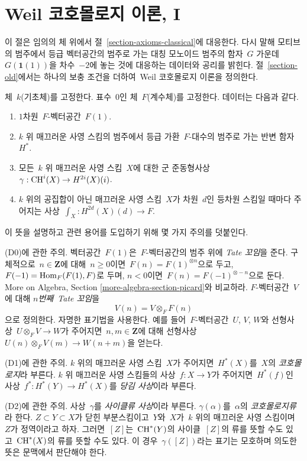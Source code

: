 \section{Weil 코호몰로지 이론, I}
\label{section-axioms}

\noindent
이 절은 임의의 체 위에서 절\  \ref{section-axioms-classical}에 대응한다.
다시 말해 모티브의 범주에서 등급 벡터공간의 범주로 가는 대칭 모노이드
범주의 함자\  $G$ 가운데\  $G(\mathbf{1}(1))$을 차수\  $-2$에 놓는 것에
대응하는 데이터와 공리를 밝힌다. 절\  \ref{section-old}에서는 하나의
보충 조건을 더하여\  Weil 코호몰로지 이론을 정의한다.

\medskip\noindent
체\  $k$(기초체)를 고정한다.
표수\  $0$인 체\  $F$(계수체)를 고정한다.
데이터는 다음과 같다.
\begin{enumerate}
\item[(D0)] $1$차원\  $F$-벡터공간\  $F(1)$.
\item[(D1)] $k$ 위 매끄러운 사영 스킴의 범주에서 등급 가환\ 
$F$-대수의 범주로 가는 반변 함자\  $H^*$.
\item[(D2)] 모든\  $k$ 위 매끄러운 사영 스킴\  $X$에 대한 군 준동형사상\ 
$\gamma : \mathop{\mathrm{CH}}\nolimits^i(X) \to H^{2i}(X)(i)$.
\item[(D3)] $k$ 위의 공집합이 아닌 매끄러운 사영 스킴\  $X$가 차원\ 
$d$인 등차원 스킴일 때마다 주어지는 사상\ 
$\int_X : H^{2d}(X)(d) \to F$.
\end{enumerate}
이 뜻을 설명하고 관련 용어를 도입하기 위해 몇 가지 주의를 덧붙인다.

\medskip\noindent
(D0)에 관한 주의.
벡터공간\  $F(1)$은\  $F$-벡터공간의 범주 위에 {\it Tate 꼬임}을 준다.
구체적으로\  $n \in \mathbf{Z}$에 대해\  $n \geq 0$이면\ 
$F(n) = F(1)^{\otimes n}$으로 두고, $F(-1) = \mathop{\mathrm{Hom}}\nolimits_F(F(1), F)$로 두며,
$n < 0$이면\  $F(n) = F(-1)^{\otimes - n}$으로 둔다. More on Algebra,
Section \ref{more-algebra-section-picard}와 비교하라. $F$-벡터공간\ 
$V$에 대해 {\it $n$번째\  Tate 꼬임}을
$$
V(n) = V \otimes_F F(n)
$$
으로 정의한다. 자명한 표기법을 사용한다. 예를 들어\  $F$-벡터공간\ 
$U$, $V$, $W$와 선형사상\  $U \otimes_F V \to W$가 주어지면\ 
$n, m \in \mathbf{Z}$에 대해 선형사상\ 
$U(n) \otimes_F V(m) \to W(n + m)$을 얻는다.

\medskip\noindent
(D1)에 관한 주의.
$k$ 위의 매끄러운 사영 스킴\  $X$가 주어지면\  $H^*(X)$를\  $X$의
{\it 코호몰로지}라 부른다. $k$ 위 매끄러운 사영 스킴들의 사상\ 
$f : X \to Y$가 주어지면\  $H^*(f)$인 사상\ 
$f^* : H^*(Y) \to H^*(X)$를 {\it 당김 사상}이라 부른다.

\medskip\noindent
(D2)에 관한 주의. 사상\  $\gamma$를 {\it 사이클류 사상}이라 부른다.
$\gamma(\alpha)$를\  $\alpha$의 {\it 코호몰로지류}라 한다.
$Z \subset Y \subset X$가 닫힌 부분스킴이고\  $Y$와\  $X$가\  $k$ 위의
매끄러운 사영 스킴이며\  $Z$가 정역이라고 하자. 그러면\  $[Z]$는\ 
$\mathop{\mathrm{CH}}\nolimits^*(Y)$의 사이클\  $[Z]$의 류를 뜻할 수도 있고\  $\mathop{\mathrm{CH}}\nolimits^*(X)$의 류를
뜻할 수도 있다. 이 경우\  $\gamma([Z])$라는 표기는 모호하며 의도한
뜻은 문맥에서 판단해야 한다.

